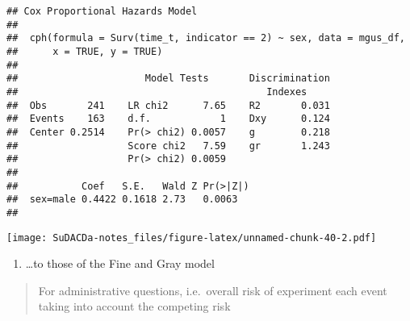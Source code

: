 \documentclass[]{book}
\newenvironment{Shaded}{\begin{snugshade}}{\end{snugshade}}
\newcommand{\KeywordTok}[1]{\textcolor[rgb]{0.13,0.29,0.53}{\textbf{{#1}}}}
\newcommand{\DataTypeTok}[1]{\textcolor[rgb]{0.13,0.29,0.53}{{#1}}}
\newcommand{\StringTok}[1]{\textcolor[rgb]{0.31,0.60,0.02}{{#1}}}
\newcommand{\CommentTok}[1]{\textcolor[rgb]{0.56,0.35,0.01}{\textit{{#1}}}}
\newcommand{\NormalTok}[1]{{#1}}
\providecommand{\tightlist}{%
  \setlength{\itemsep}{0pt}\setlength{\parskip}{0pt}}
\theoremstyle{definition}
\theoremstyle{definition}
\theoremstyle{definition}
\theoremstyle{remark}
\begin{document}
\begin{verbatim}
## Cox Proportional Hazards Model
##  
##  cph(formula = Surv(time_t, indicator == 2) ~ sex, data = mgus_df, 
##      x = TRUE, y = TRUE)
##  
##                      Model Tests       Discrimination    
##                                           Indexes        
##  Obs       241    LR chi2      7.65    R2       0.031    
##  Events    163    d.f.            1    Dxy      0.124    
##  Center 0.2514    Pr(> chi2) 0.0057    g        0.218    
##                   Score chi2   7.59    gr       1.243    
##                   Pr(> chi2) 0.0059                      
##  
##           Coef   S.E.   Wald Z Pr(>|Z|)
##  sex=male 0.4422 0.1618 2.73   0.0063  
## 
\end{verbatim}

\begin{Shaded}
\end{Shaded}

\texttt{[image: SuDACDa-notes\_files/figure-latex/unnamed-chunk-40-2.pdf]}

\begin{enumerate}
\def\labelenumi{\arabic{enumi}.}
\setcounter{enumi}{1}
\tightlist
\item
  \ldots{}to those of the Fine and Gray model
\end{enumerate}

\begin{quote}
For administrative questions, i.e.~overall risk of experiment each event
taking into account the competing risk
\end{quote}

\begin{Shaded}
\end{Shaded}
\end{document}
